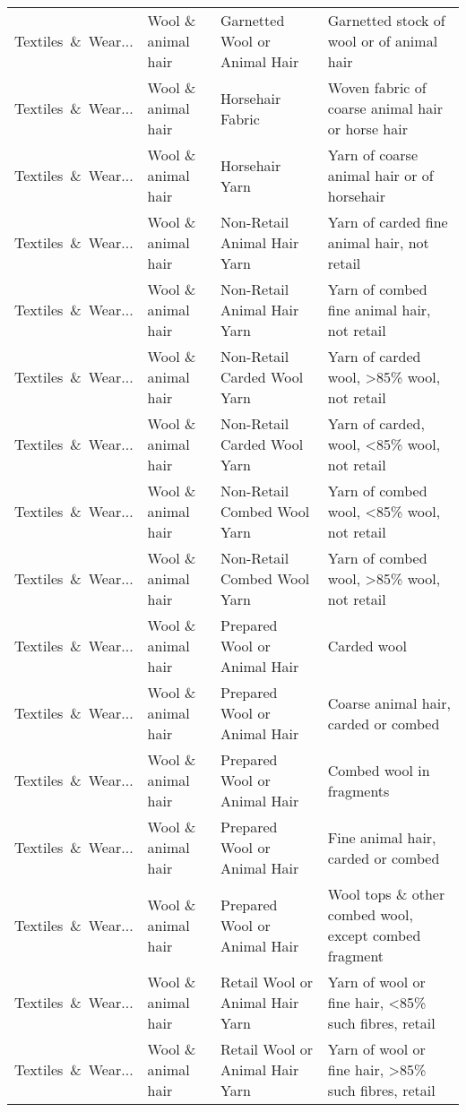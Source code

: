 \begin{appendices}
\begin{xltabular}{\textwidth}{|p{0.10\textwidth}|p{0.25\textwidth}|p{0.24\textwidth}|p{0.31\textwidth}|}
Textiles\ \&\ Wear... & Wool \& animal hair & Garnetted Wool or Animal Hair & Garnetted stock of wool or of animal hair \\
Textiles\ \&\ Wear... & Wool \& animal hair & Horsehair Fabric & Woven fabric of coarse animal hair or horse hair \\
Textiles\ \&\ Wear... & Wool \& animal hair & Horsehair Yarn & Yarn of coarse animal hair or of horsehair \\
Textiles\ \&\ Wear... & Wool \& animal hair & Non-Retail Animal Hair Yarn & Yarn of carded fine animal hair, not retail \\
Textiles\ \&\ Wear... & Wool \& animal hair & Non-Retail Animal Hair Yarn & Yarn of combed fine animal hair, not retail \\
Textiles\ \&\ Wear... & Wool \& animal hair & Non-Retail Carded Wool Yarn & Yarn of carded wool, >85\% wool, not retail \\
Textiles\ \&\ Wear... & Wool \& animal hair & Non-Retail Carded Wool Yarn & Yarn of carded, wool, <85\% wool, not retail \\
Textiles\ \&\ Wear... & Wool \& animal hair & Non-Retail Combed Wool Yarn & Yarn of combed wool, <85\% wool, not retail \\
Textiles\ \&\ Wear... & Wool \& animal hair & Non-Retail Combed Wool Yarn & Yarn of combed wool, >85\% wool, not retail \\
Textiles\ \&\ Wear... & Wool \& animal hair & Prepared Wool or Animal Hair & Carded wool \\
Textiles\ \&\ Wear... & Wool \& animal hair & Prepared Wool or Animal Hair & Coarse animal hair, carded or combed \\
Textiles\ \&\ Wear... & Wool \& animal hair & Prepared Wool or Animal Hair & Combed wool in fragments \\
Textiles\ \&\ Wear... & Wool \& animal hair & Prepared Wool or Animal Hair & Fine animal hair, carded or combed \\
Textiles\ \&\ Wear... & Wool \& animal hair & Prepared Wool or Animal Hair & Wool tops \& other combed wool, except combed fragment \\
Textiles\ \&\ Wear... & Wool \& animal hair & Retail Wool or Animal Hair Yarn & Yarn of wool or fine hair, <85\% such fibres, retail \\
Textiles\ \&\ Wear... & Wool \& animal hair & Retail Wool or Animal Hair Yarn & Yarn of wool or fine hair, >85\% such fibres, retail \\
		\end{xltabular}
	

\end{appendices}
